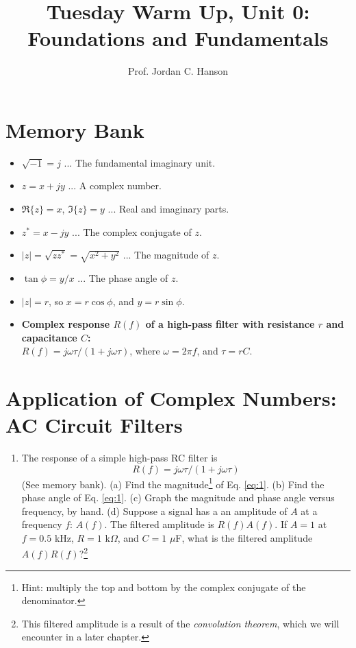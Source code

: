 \documentclass{article}
\begin{document}
\twocolumn

\title{Tuesday Warm Up, Unit 0: Foundations and Fundamentals}
\author{Prof. Jordan C. Hanson}
\maketitle

\section{Memory Bank}

\begin{itemize}
\item $\sqrt{-1} = j$ ... The fundamental imaginary unit.
\item $z = x + jy$ ... A complex number.
\item $\Re \lbrace z \rbrace = x$, $\Im \lbrace z \rbrace = y$ ... Real and imaginary parts.
\item $z^{*} = x - j y$ ... The complex conjugate of $z$.
\item $|z| = \sqrt{z z^{*}} = \sqrt{x^2 + y^2}$ ... The magnitude of $z$.
\item $\tan\phi = y/x$ ... The phase angle of $z$.
\item $|z| = r$, so $x = r\cos\phi$, and $y = r\sin\phi$.
\item \textbf{Complex response $R(f)$ of a high-pass filter with resistance $r$ and capacitance $C$:} \\ $R(f) = j\omega\tau/(1+j\omega \tau)$, where $\omega = 2\pi f$, and $\tau = rC$.
\end{itemize}

\section{Application of Complex Numbers: AC Circuit Filters}

\begin{enumerate}
\item The response of a simple high-pass RC filter is
\begin{equation}
R(f) = j\omega\tau/(1+j\omega \tau) \label{eq:1}
\end{equation}
(See memory bank).  (a) Find the magnitude\footnote{Hint: multiply the top and bottom by the complex conjugate of the denominator.} of Eq. \ref{eq:1}.  (b) Find the phase angle of Eq. \ref{eq:1}. (c) Graph the magnitude and phase angle versus frequency, by hand.  (d) Suppose a signal has a an amplitude of $A$ at a frequency $f$: $A(f)$.  The filtered amplitude is $R(f) A(f)$.  If $A=1$ at $f = 0.5$ kHz, $R = 1$ k$\Omega$, and $C = 1$ $\mu$F, what is the filtered amplitude $A(f) R(f)$?\footnote{This filtered amplitude is a result of the \textit{convolution theorem}, which we will encounter in a later chapter.} \\ \vspace{4cm}
\end{enumerate}
\end{document}

